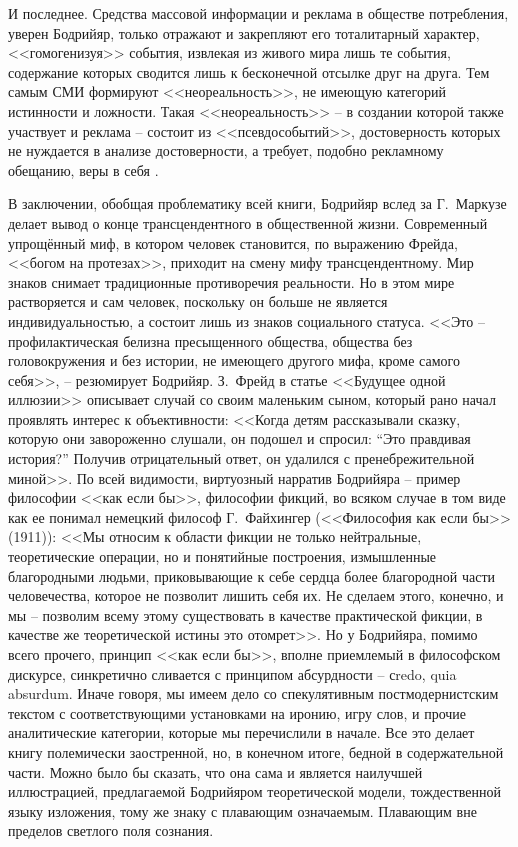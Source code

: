 И последнее. Средства массовой информации и реклама в обществе потребления,
уверен Бодрийяр, только отражают и закрепляют его тоталитарный характер, <<гомогенизуя>>
события, извлекая из живого мира лишь те события, содержание которых сводится лишь
к бесконечной отсылке друг на друга. Тем самым СМИ формируют <<неореальность>>,
не имеющую категорий истинности и ложности. Такая <<неореальность>> -- в создании
которой также участвует и реклама -- состоит из <<псевдособытий>>, достоверность
которых не нуждается в анализе достоверности, а требует, подобно рекламному обещанию,
веры в себя \autocite[][150--166]{bodriyar_society}.

В заключении, обобщая проблематику всей книги, Бодрийяр вслед за Г.~Маркузе делает
вывод о конце трансцендентного в общественной жизни. Современный упрощённый миф,
в котором человек становится, по выражению Фрейда, <<богом на протезах>>,
приходит на смену мифу трансцендентному. Мир знаков снимает традиционные противоречия
реальности. Но в этом мире растворяется и сам человек, поскольку он больше не
является индивидуальностью, а состоит лишь из знаков социального статуса.
<<Это -- профилактическая белизна пресыщенного общества, общества без головокружения
и без истории, не имеющего другого мифа, кроме самого себя>>, -- резюмирует Бодрийяр.
\autocite[][245]{bodriyar_society}\autocite{kara2000}
З.~Фрейд в статье <<Будущее одной иллюзии>> описывает случай со своим маленьким
сыном, который рано начал проявлять интерес к объективности: <<Когда детям
рассказывали сказку, которую они завороженно слушали, он подошел и спросил:
``Это правдивая история?'' Получив отрицательный ответ, он удалился с пренебрежительной
миной>>\autocite[][40]{freud1992}. По всей видимости, виртуозный нарратив Бодрийяра --
пример философии <<как если бы>>, философии фикций, во всяком случае в том виде
как ее понимал немецкий философ Г.~Файхингер (<<Философия как если бы>> (1911)):
<<Мы относим к области фикции не только нейтральные, теоретические операции, но
и понятийные построения, измышленные благородными людьми, приковывающие к себе
сердца более благородной части человечества, которое не позволит лишить себя их.
Не сделаем этого, конечно, и мы -- позволим всему этому существовать в качестве
практической фикции, в качестве же теоретической истины это отомрет>>\autocite{freud1992}.
Но у Бодрийяра, помимо всего прочего, принцип <<как если бы>>,
вполне приемлемый в философском дискурсе, синкретично сливается с принципом
абсурдности -- сredo, quia absurdum. Иначе говоря, мы имеем дело со спекулятивным
постмодернистским текстом с соответствующими установками на иронию,
игру слов, и прочие аналитические категории, которые мы перечислили в начале.
Все это делает книгу полемически заостренной, но, в конечном итоге, бедной в
содержательной части. Можно было бы сказать, что она сама и является наилучшей
иллюстрацией, предлагаемой Бодрийяром теоретической модели, тождественной языку
изложения, тому же знаку с плавающим означаемым. Плавающим вне пределов светлого
поля сознания.

